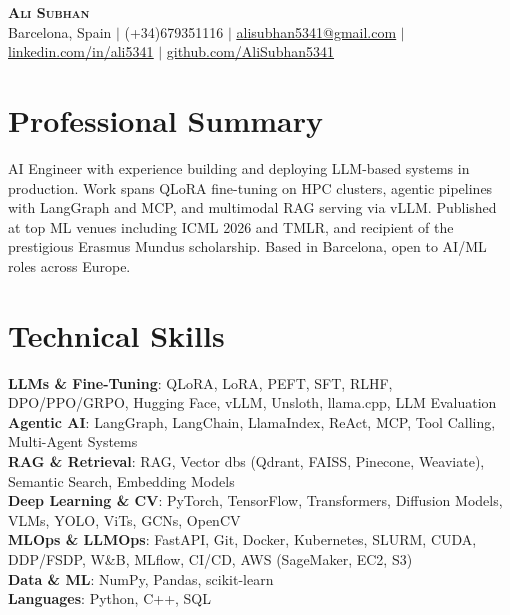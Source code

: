\documentclass[letterpaper,11pt]{article}
\begin{document}
\begin{center}
    \textbf{\Huge \scshape Ali Subhan} \\ \vspace{1pt}
    \small Barcelona, Spain $|$ (+34)679351116 $|$ \href{mailto:alisubhan5341@gmail.com}{\underline{alisubhan5341@gmail.com}} $|$ \href{https://linkedin.com/in/ali5341}{\underline{linkedin.com/in/ali5341}} $|$ \href{https://github.com/AliSubhan5341}{\underline{github.com/AliSubhan5341}}
\end{center}


\section{Professional Summary}
\small{AI Engineer with experience building and deploying LLM-based systems in production. Work spans QLoRA fine-tuning on HPC clusters, agentic pipelines with LangGraph and MCP, and multimodal RAG serving via vLLM. Published at top ML venues including ICML 2026 and TMLR, and recipient of the prestigious Erasmus Mundus scholarship. Based in Barcelona, open to AI/ML roles across Europe.}
\vspace{4pt}


\section{Technical Skills}
 \begin{itemize}[leftmargin=0.15in, label={}]
    \small{\item{
     \textbf{LLMs \& Fine-Tuning}{: QLoRA, LoRA, PEFT, SFT, RLHF, DPO/PPO/GRPO, Hugging Face, vLLM, Unsloth, llama.cpp, LLM Evaluation} \\
     \textbf{Agentic AI}{: LangGraph, LangChain, LlamaIndex, ReAct, MCP, Tool Calling, Multi-Agent Systems} \\
     \textbf{RAG \& Retrieval}{: RAG, Vector dbs (Qdrant, FAISS, Pinecone, Weaviate), Semantic Search, Embedding Models} \\
     \textbf{Deep Learning \& CV}{: PyTorch, TensorFlow, Transformers, Diffusion Models, VLMs, YOLO, ViTs, GCNs, OpenCV} \\
     \textbf{MLOps \& LLMOps}{: FastAPI, Git, Docker, Kubernetes, SLURM, CUDA, DDP/FSDP, W\&B, MLflow, CI/CD, AWS (SageMaker, EC2, S3)} \\
     \textbf{Data \& ML}{: NumPy, Pandas, scikit-learn} \\
     \textbf{Languages}{: Python, C++, SQL}
    }}
 \end{itemize}
\end{document}

